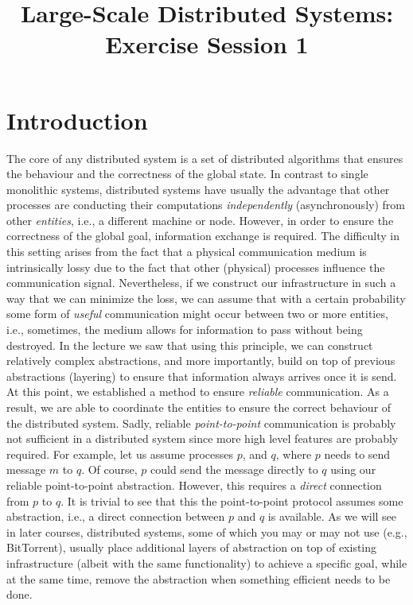 

\title{Large-Scale Distributed Systems: Exercise Session 1}
\maketitle

\section{Introduction}
\label{sec:introduction}

The core of any distributed system is a set of distributed algorithms that ensures the behaviour and the correctness of the global state. In contrast to single monolithic systems, distributed systems have usually the advantage that other processes are conducting their computations \emph{independently} (asynchronously) from other \emph{entities}, i.e., a different machine or node. However, in order to ensure the correctness of the global goal, information exchange is required. The difficulty in this setting arises from the fact that a physical communication medium is intrinsically lossy due to the fact that other (physical) processes influence the communication signal. Nevertheless, if we construct our infrastructure in such a way that we can minimize the loss, we can assume that with a certain probability some form of \emph{useful} communication might occur between two or more entities, i.e., sometimes, the medium allows for information to pass without being destroyed. In the lecture we saw that using this principle, we can construct relatively complex abstractions, and more importantly, build on top of previous abstractions (layering) to ensure that information always arrives once it is send.\\

At this point, we established a method to ensure \emph{reliable} communication. As a result, we are able to coordinate the entities to ensure the correct behaviour of the distributed system. Sadly, reliable \emph{point-to-point} communication is probably not sufficient in a distributed system since more high level features are probably required. For example, let us assume processes $p$, and $q$, where $p$ needs to send message $m$ to $q$. Of course, $p$ could send the message directly to $q$ using our reliable point-to-point abstraction. However, this requires a \emph{direct} connection from $p$ to $q$. It is trivial to see that this the point-to-point protocol assumes some abstraction, i.e., a direct connection between $p$ and $q$ is available. As we will see in later courses, distributed systems, some of which you may or may not use (e.g., BitTorrent), usually place additional layers of abstraction on top of existing infrastructure (albeit with the same functionality) to achieve a specific goal, while at the same time, remove the abstraction when something efficient needs to be done.\\

